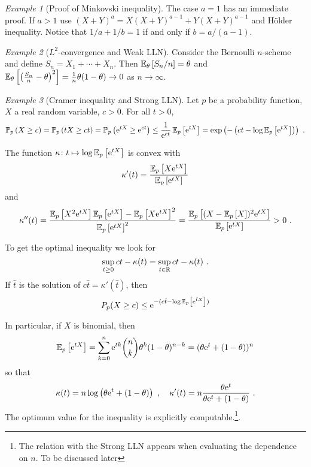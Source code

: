 \documentclass[12pt,a4paper]{amsart}
\theoremstyle{plain}%
\theoremstyle{definition}
\theoremstyle{remark}
\newtheorem{example}{Example}
\begin{document}
\begin{example}[Proof of Minkovski inequality]
The case $a=1$ has an immediate proof. If $a > 1$ use $(X+Y)^a = X(X+Y)^{a-1} + Y(X+Y)^{a-1}$ and H\"older inequality. Notice that $1/a+1/b=1$ if and only if $b = a/(a-1)$.  
\end{example}

\begin{example}[$L^2$-convergence and Weak LLN] Consider the Bernoulli $n$-scheme and define $S_n=X_1+\cdots+X_n$. Then $\operatorname{\mathbb E}_{\theta}\left[S_n/n\right] = \theta$ and $\operatorname{\mathbb E}_{\theta}\left[\left(\frac {S_n}n - \theta\right)^2\right] = \frac1n \theta(1-\theta) \to 0$ as $n \to \infty$.
\end{example}

\begin{example}[Cramer inequality and Strong LLN]
Let $p$ be a probability function, $X$ a real random variable, $c >0$. For all $t > 0$,
\begin{equation*}
  \operatorname{\mathbb P}_{p}\left( X \geq c\right) = \operatorname{\mathbb P}_{p}\left(tX \geq ct\right) = \operatorname{\mathbb P}_{p}\left(\mathrm{e}^{tX} \geq \mathrm{e}^{ct}\right) \leq \frac1{\mathrm{e}^{ct}} \operatorname{\mathbb E}_{p}\left[\mathrm{e}^{tX}\right] = \exp\left(- \left(ct - \log\operatorname{\mathbb E}_{p}\left[\mathrm{e}^{tX}\right]\right)\right) \ . 
\end{equation*}

The function $\kappa \colon t \mapsto \log \operatorname{\mathbb E}_{p}\left[\mathrm{e}^{tX}\right]$ is convex with
\begin{equation*}
  \kappa'(t) = \frac{\operatorname{\mathbb E}_{p}\left[X \mathrm{e}^{tX}\right]}{\operatorname{\mathbb E}_{p}\left[\mathrm{e}^{tX}\right]} 
\end{equation*}
and
\begin{equation*}
  \kappa''(t) = \frac{\expectat p {X^2\euler^{tX}}\expectat p {\euler^{tX}} - \expectat p {X\euler^{tX}}^2}{\expectat p {\euler^{tX}}^2} = \frac{\expectat p {(X - \expectat p X)^2 \euler^{tX}}}{\expectat p {\euler^{tX}}} > 0 \ .
\end{equation*}

To get the optimal inequality we look for
\begin{equation*}
  \sup_{t \geq 0}{ct - \kappa(t)} = \sup_{t \in \mathbb{R}} ct - \kappa(t) \ .
\end{equation*}
If $\hat t$ is the solution of $c\hat t = \kappa'(\hat t)$, then
\begin{equation*}
  P_p(X \geq c) \leq \mathrm{e}^{-(c\hat t - \log \operatorname{\mathbb E}_{p}\left[\mathrm{e}^{\hat tX}\right])}
\end{equation*}

In particular, if $X$ is binomial, then
\begin{equation*}
  \operatorname{\mathbb E}_{p}\left[\mathrm{e}^{tX}\right] = \sum_{k=0}^n \mathrm{e}^{tk} \binom n k \theta^k (1-\theta)^{n-k} = (\theta \mathrm{e}^t + (1 - \theta))^n 
\end{equation*}
so that
\begin{equation*}
  \kappa(t) = n \log\left(\theta \mathrm{e}^t + (1 - \theta)\right) \ , \quad \kappa'(t) = n \frac{\theta\mathrm{e}^t}{\theta \mathrm{e}^t + (1 - \theta)} \ .
\end{equation*}
The optimum value for the inequality is explicitly computable.\footnote{The relation with the Strong LLN appears when evaluating the dependence on $n$. To be discussed later}.
\end{example}
\end{document}
